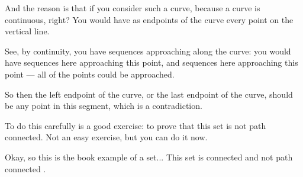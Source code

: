 \begin{speech}[00:49:28 - 00:49:58]
And the reason is that if you consider such a curve, because a curve is continuous, right? You would have as endpoints of the curve every point on the vertical line.

See, by continuity, you have sequences approaching along the curve: you would have sequences here approaching this point, and sequences here approaching this point --- all of the points could be approached.

So then the left endpoint of the curve, or the last endpoint of the curve, should be any point in this segment, which is a contradiction.

To do this carefully is a good exercise: to prove that this set is not path connected. Not an easy exercise, but you can do it now.

Okay, so this is the book example of a set... This set is connected and not path connected .
\end{speech}

